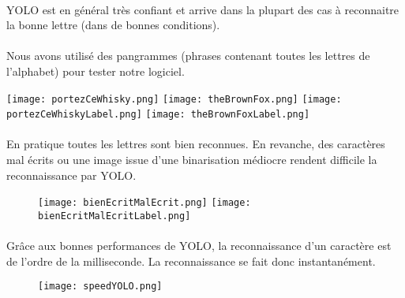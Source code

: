 \documentclass[a4paper]{article}
\begin{document}
			\paragraph{} YOLO est en général très confiant et arrive dans la plupart des cas à reconnaitre la bonne lettre (dans de bonnes conditions).
		
			\paragraph{} Nous avons utilisé des pangrammes (phrases contenant toutes les lettres de l'alphabet) pour tester notre logiciel.
			
			\begin{center}
				\texttt{[image: portezCeWhisky.png]}
				\texttt{[image: theBrownFox.png]}
				\texttt{[image: portezCeWhiskyLabel.png]}
				\texttt{[image: theBrownFoxLabel.png]}
				\caption{ Pangrammes français et anglais}
			\end{center}
			\newline
			\newline
			\paragraph{} En pratique toutes les lettres sont bien reconnues. En revanche, des caractères mal écrits ou une image issue d'une binarisation médiocre rendent difficile la reconnaissance par YOLO.
			


			\begin{figure}[h]
				\texttt{[image: bienEcritMalEcrit.png]}
				\texttt{[image: bienEcritMalEcritLabel.png]}
			\end{figure}


			\paragraph{} Grâce aux bonnes performances de YOLO, la reconnaissance d'un caractère est de l'ordre de la milliseconde. La reconnaissance se fait donc instantanément.

			\begin{figure}[h]
				\centering
				\texttt{[image: speedYOLO.png]}
				\caption{}
				\label{fig:speedYOLO}
			\end{figure}
\end{document}
